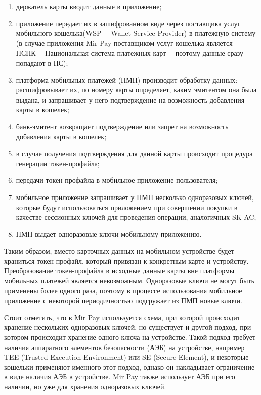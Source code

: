 \begin{enumerate}
    \item держатель карты вводит данные в приложение;
    \item приложение передает их в зашифрованном виде через поставщика услуг мобильного кошелька(WSP~-- Wallet Service Provider) в платежную систему (в случае приложения Mir Pay поставщиком услуг кошелька является НСПК~-- Национальная система платежных карт~-- поэтому данные сразу попадают в ПС);
    \item платформа мобильных платежей (ПМП) производит обработку данных: расшифровывает их, по номеру карты определяет, каким эмитентом она была выдана, и запрашивает у него подтверждение на возможность добавления карты в кошелек;
    \item банк-эмитент возвращает подтверждение или запрет на возможность добавления карты в кошелек;
    \item в случае получения подтверждения для данной карты происходит процедура генерации токен-профайла;
    \item передачи токен-профайла в мобильное приложение пользователя;
    \item мобильное приложение запрашивает у ПМП несколько одноразовых ключей, которые будут использоваться приложением при совершении покупки в качестве сессионных ключей для проведения операции, аналогичных SK-AC;
    \item ПМП выдает одноразовые ключи мобильному приложению.
\end{enumerate}

Таким образом, вместо карточных данных на мобильном устройстве будет храниться токен-профайл, который привязан к конкретным карте и устройству.
Преобразование токен-профайла в исходные данные карты вне платформы мобильных платежей является невозможным.
Одноразовые ключи не могут быть применены более одного раза, поэтому в процессе использования мобильное приложение с некоторой периодичностью подгружает из ПМП новые ключи.


Стоит отметить, что в Mir Pay используется схема, при которой происходит хранение нескольких одноразовых ключей, но существует и другой подход, при котором происходит хранение одного ключа на устройстве.
Такой подход требует наличия аппаратного элементов безопасности (АЭБ) на устройстве, например TEE (Trusted Execution Environment) или SE (Secure Element), и некоторые кошельки применяют именного этот подход, однако он накладывает ограничение в виде наличия АЭБ в устройстве.
Mir Pay также использует АЭБ при его наличии, но уже для хранения одноразовых ключей.

